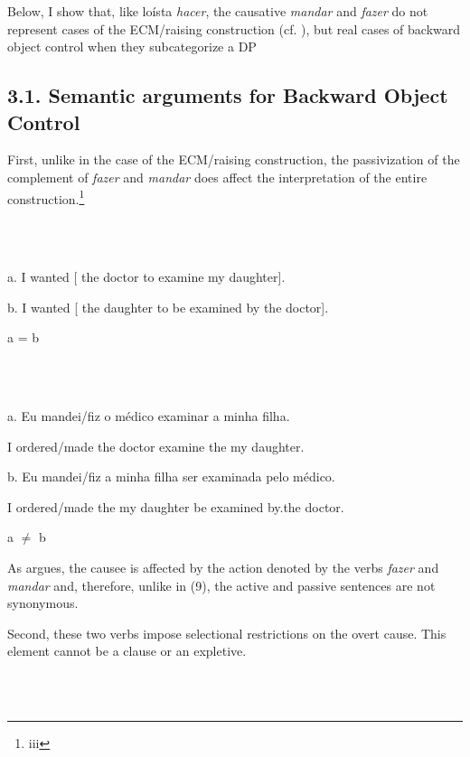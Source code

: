 \documentclass[output=paper]{langsci/langscibook}
\begin{document}
Below, I show that, like loísta \textit{hacer}, the causative \textit{mandar} and \textit{fazer} do not represent cases of the ECM/raising construction (cf. \citealt{Farrell1995}), but real cases of backward object control when they subcategorize a DP

\subsection{ 3.1. Semantic arguments for Backward Object Control} 

First, unlike in the case of the ECM/raising construction, the passivization of the complement of \textit{fazer} and \textit{mandar} does affect the interpretation of the entire construction.\footnote{iii}

\ea%
    \label{ex:key:9}
    \gll\\
        \\
    \glt
    \z

          a.  I wanted [ the doctor to examine my daughter].

  b.  I wanted [ the daughter to be examined by the doctor].

      a = b                \citep[119]{Farrell1995}

\ea%
    \label{ex:key:10}
    \gll\\
        \\
    \glt
    \z

          a.  Eu   mandei/fiz      o    médico   examinar  a    minha filha.

    I         ordered/made the doctor     examine    the my     daughter.

  b.  Eu   mandei/fiz    a     minha filha      ser examinada pelo    médico.

    I         ordered/made the  my      daughter  be examined    by.the doctor.

           a ${\neq}$ b

As \citet{Farrell1995} argues, the causee is affected by the action denoted by the verbs \textit{fazer} and \textit{mandar} and, therefore, unlike in (9), the active and passive sentences are not synonymous.

Second, these two verbs impose selectional restrictions on the overt cause. This element cannot be a clause or an expletive. 

\ea%
    \label{ex:key:11}
    \gll\\
        \\
    \glt
    \z
\end{document}
